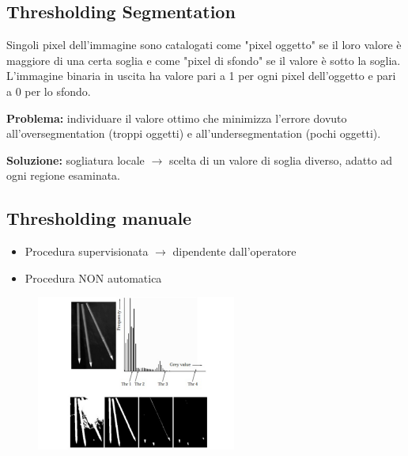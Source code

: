 \subsection{Thresholding Segmentation}
Singoli pixel dell'immagine sono catalogati come "pixel oggetto" se
il loro valore è maggiore di una certa soglia e come "pixel di sfondo"
se il valore è sotto la soglia. L'immagine binaria in uscita ha valore
pari a 1 per ogni pixel dell'oggetto e pari a 0 per lo sfondo.
\begin{trivlist}
    \item \textbf{Problema:} individuare il valore ottimo che minimizza l'errore dovuto all'oversegmentation (troppi oggetti) e
    all'undersegmentation (pochi oggetti).
    \item \textbf{Soluzione:} sogliatura locale $\rightarrow$ scelta di un valore di soglia diverso,
    adatto ad ogni regione esaminata.
\end{trivlist}

\subsection{Thresholding manuale}
\begin{itemize}
    \item Procedura supervisionata $\rightarrow$ dipendente dall'operatore
    \item Procedura NON automatica
\end{itemize}
\begin{figure}[H]
    \centering
    \includegraphics[width=\linewidth, keepaspectratio]{capitoli/immagini/imgs/trash-manuale.png}
\end{figure}

